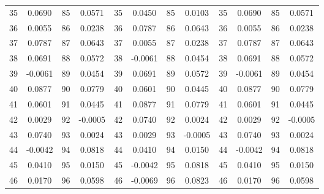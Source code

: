 \documentclass{article}
\begin{document}
\begin{longtable}[c]{cccccccccccc}
	35        & 0.0690       & 85            & 0.0571            & 35       & 0.0450        & 85            & 0.0103            & 35       & 0.0690        & 85            & 0.0571            \\
	36        & 0.0055       & 86            & 0.0238            & 36       & 0.0787        & 86            & 0.0643            & 36       & 0.0055        & 86            & 0.0238            \\
	37        & 0.0787       & 87            & 0.0643            & 37       & 0.0055        & 87            & 0.0238            & 37       & 0.0787        & 87            & 0.0643            \\
	38        & 0.0691       & 88            & 0.0572            & 38       & -0.0061       & 88            & 0.0454            & 38       & 0.0691        & 88            & 0.0572            \\
	39        & -0.0061      & 89            & 0.0454            & 39       & 0.0691        & 89            & 0.0572            & 39       & -0.0061       & 89            & 0.0454            \\
	40        & 0.0877       & 90            & 0.0779            & 40       & 0.0601        & 90            & 0.0445            & 40       & 0.0877        & 90            & 0.0779            \\
	41        & 0.0601       & 91            & 0.0445            & 41       & 0.0877        & 91            & 0.0779            & 41       & 0.0601        & 91            & 0.0445            \\
	42        & 0.0029       & 92            & -0.0005           & 42       & 0.0740        & 92            & 0.0024            & 42       & 0.0029        & 92            & -0.0005           \\
	43        & 0.0740       & 93            & 0.0024            & 43       & 0.0029        & 93            & -0.0005           & 43       & 0.0740        & 93            & 0.0024            \\
	44        & -0.0042      & 94            & 0.0818            & 44       & 0.0410        & 94            & 0.0150            & 44       & -0.0042       & 94            & 0.0818            \\
	45        & 0.0410       & 95            & 0.0150            & 45       & -0.0042       & 95            & 0.0818            & 45       & 0.0410        & 95            & 0.0150            \\
	46        & 0.0170       & 96            & 0.0598            & 46       & -0.0069       & 96            & 0.0823            & 46       & 0.0170        & 96            & 0.0598            \\

\end{longtable}
\end{document}
